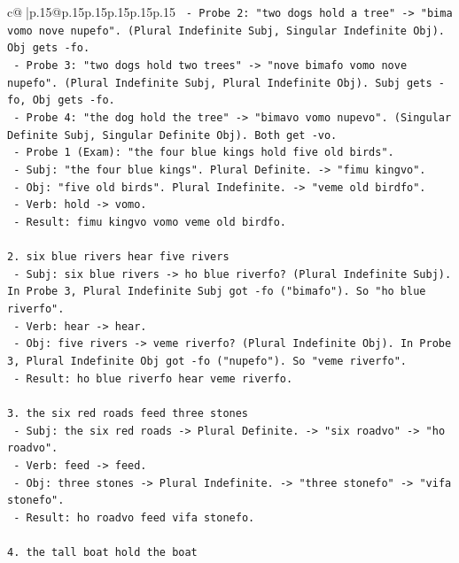 \documentclass{article}
\begin{document}
{\begin{supertabular}{c@{$\;$}|p{.15\linewidth}@{}p{.15\linewidth}p{.15\linewidth}p{.15\linewidth}p{.15\linewidth}p{.15\linewidth}}
{{{\texttt{     {-} Probe 2: "two dogs hold a tree" {-}> "bima vomo nove nupefo". (Plural Indefinite Subj, Singular Indefinite Obj). Obj gets {-}fo.} \\
\texttt{     {-} Probe 3: "two dogs hold two trees" {-}> "nove bimafo vomo nove nupefo". (Plural Indefinite Subj, Plural Indefinite Obj). Subj gets {-}fo, Obj gets {-}fo.} \\
\texttt{     {-} Probe 4: "the dog hold the tree" {-}> "bimavo vomo nupevo". (Singular Definite Subj, Singular Definite Obj). Both get {-}vo.} \\
\texttt{     {-} Probe 1 (Exam): "the four blue kings hold five old birds".} \\
\texttt{       {-} Subj: "the four blue kings". Plural Definite. {-}> "fimu kingvo".} \\
\texttt{       {-} Obj: "five old birds". Plural Indefinite. {-}> "veme old birdfo".} \\
\texttt{       {-} Verb: hold {-}> vomo.} \\
\texttt{       {-} Result: fimu kingvo vomo veme old birdfo.} \\
\\ 
\texttt{2. six blue rivers hear five rivers} \\
\texttt{   {-} Subj: six blue rivers {-}> ho blue riverfo? (Plural Indefinite Subj). In Probe 3, Plural Indefinite Subj got {-}fo ("bimafo"). So "ho blue riverfo".} \\
\texttt{   {-} Verb: hear {-}> hear.} \\
\texttt{   {-} Obj: five rivers {-}> veme riverfo? (Plural Indefinite Obj). In Probe 3, Plural Indefinite Obj got {-}fo ("nupefo"). So "veme riverfo".} \\
\texttt{   {-} Result: ho blue riverfo hear veme riverfo.} \\
\\ 
\texttt{3. the six red roads feed three stones} \\
\texttt{   {-} Subj: the six red roads {-}> Plural Definite. {-}> "six roadvo" {-}> "ho roadvo".} \\
\texttt{   {-} Verb: feed {-}> feed.} \\
\texttt{   {-} Obj: three stones {-}> Plural Indefinite. {-}> "three stonefo" {-}> "vifa stonefo".} \\
\texttt{   {-} Result: ho roadvo feed vifa stonefo.} \\
\\ 
\texttt{4. the tall boat hold the boat} \\
}}}
\end{supertabular}}
\end{document}
